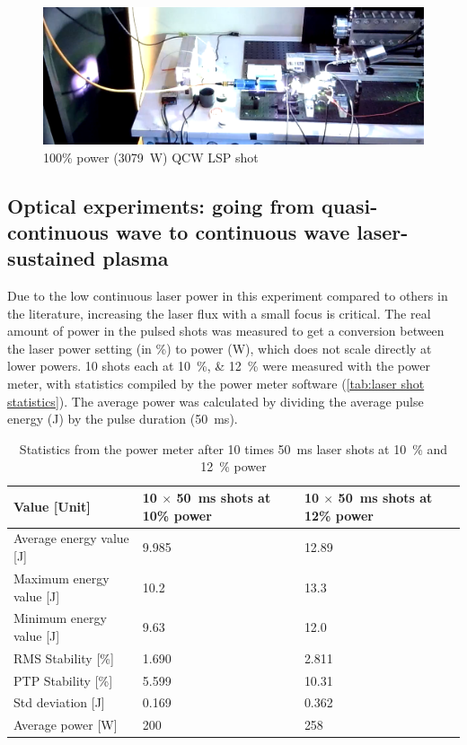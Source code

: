             \begin{figure}[!ht]
                \centering
                \includegraphics[width=\textwidth]{assets/4 experiments/holy jesus look at this.png}
                \caption{100\% power (\qty{3079}{W}) QCW LSP shot}
                \label{fig: big flash}
            \end{figure}

        \subsection{Optical experiments: going from quasi-continuous wave to continuous wave laser-sustained plasma}

            Due to the low continuous laser power in this experiment compared to others in the literature, increasing the laser flux with a small focus is critical. The real amount of power in the pulsed shots was measured to get a conversion between the laser power setting (in \%) to power (W), which does not scale directly at lower powers. 10 shots each at \qtylist{10; 12}{\%} were measured with the power meter, with statistics compiled by the power meter software (\autoref{tab:laser shot statistics}). The average power was calculated by dividing the average pulse energy (J) by the pulse duration (\qty{50}{ms}).

            \begin{table}[!ht]
                \caption{Statistics from the power meter after 10 times \qty{50}{ms} laser shots at \qty{10}{\%} and \qty{12}{\%} power}
                \label{tab:laser shot statistics}
                \begin{tabularx}{\textwidth}{@{}lX<{\raggedright}X<{\raggedright}@{}}
                \toprule
                Value {[}Unit{]} & 10 $\times$ \qty{50}{ms} shots at 10\% power & 10 $\times$ \qty{50}{ms} shots at 12\% power \\ \midrule
                Average energy value {[}J{]}  & 9.985 & 12.89 \\
                Maximum energy value {[}J{]}  & 10.2  & 13.3  \\
                Minimum energy value {[}J{]}  & 9.63  & 12.0  \\
                RMS Stability {[}\%{]} & 1.690 & 2.811 \\
                PTP Stability {[}\%{]} & 5.599 & 10.31 \\
                Std deviation {[}J{]}  & 0.169 & 0.362 \\
                Average power {[}W{]}  & 200 & 258  \\ 
                \bottomrule
                \end{tabularx}
            \end{table}
            
